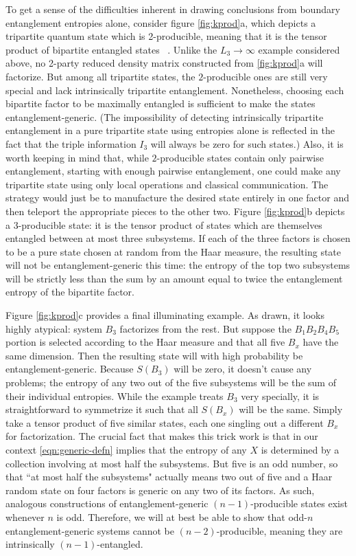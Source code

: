 \documentclass[12pt]{article}
\numberwithin{equation}{section}
\begin{document}
To get a sense of the difficulties inherent in drawing conclusions from boundary entanglement entropies alone, consider figure \ref{fig:kprod}a, which depicts a tripartite quantum state which is 2-producible, meaning that it is the tensor product of bipartite entangled states~\cite{guhne2005multipartite} . Unlike the $L_3 \rightarrow \infty$ example considered above, no 2-party reduced density matrix constructed from \ref{fig:kprod}a  will factorize. But among all tripartite states, the $2$-producible ones are still very special and lack intrinsically tripartite entanglement. Nonetheless, choosing each bipartite factor to be maximally entangled is sufficient to make the states entanglement-generic. (The impossibility of detecting intrinsically tripartite entanglement in a pure tripartite state using entropies alone is reflected in the fact that the triple information $I_3$ will always be zero for such states.)
Also, it is worth keeping in mind that, while $2$-producible states contain only pairwise entanglement, starting with enough pairwise entanglement, one could make any tripartite state using only local operations and classical communication. The strategy would just be to manufacture the desired state entirely in one factor and then teleport the appropriate pieces to the other two. Figure \ref{fig:kprod}b depicts a 3-producible state: it is the tensor product of states which are themselves entangled between at most three subsystems. If each of the three factors is chosen to be a pure state chosen at random from the Haar measure, the resulting state will not be entanglement-generic this time: the entropy of the top two subsystems will be strictly less than the sum by an amount equal to twice the entanglement entropy of the bipartite factor.

Figure \ref{fig:kprod}c provides a final illuminating example. As drawn, it looks highly atypical: system $B_3$ factorizes from the rest. But suppose the $B_1B_2B_4B_5$ portion is selected according to the Haar measure and that all five $B_x$ have the same dimension. Then the resulting state will with high probability be entanglement-generic. Because $S(B_3)$ will be zero, it doesn't cause any problems; the entropy of any two out of the five subsystems will be the sum of their individual entropies. While the example treats $B_3$ very specially, it is straightforward to symmetrize it such that all $S(B_x)$ will be the same. Simply take a tensor product of five similar states, each one singling out a different $B_x$ for factorization. The crucial fact that makes this trick work is that in our context \eqref{eqn:generic-defn} implies that the entropy of any $X$ is determined by a collection involving at most half the subsystems. But five is an odd number, so that ``at most half the subsystems" actually means two out of five and a Haar random state on four factors is generic on any two of its factors. As such, analogous constructions of entanglement-generic $(n-1)$-producible states exist whenever $n$ is odd.  Therefore, we will at best be able to show that odd-$n$ entanglement-generic systems cannot be $(n-2)$-producible, meaning they are intrinsically $(n-1)$-entangled.
\end{document}

